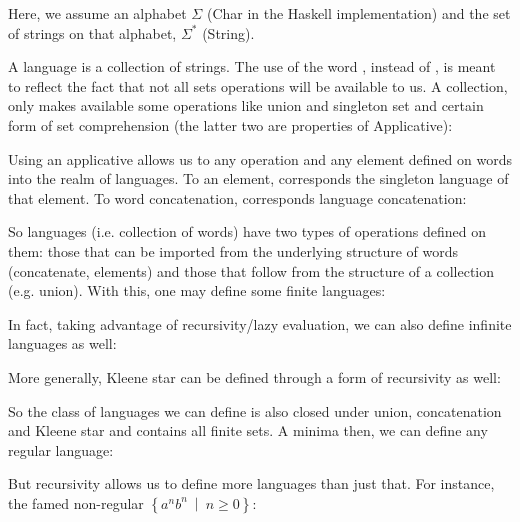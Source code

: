 Here, we assume an alphabet $\Sigma$ (\textsf{Char} in the Haskell implementation) and the set of strings on that alphabet, $\Sigma^*$ (\textsf{String}).

A language is a collection of strings. The use of the word , instead of , is meant to reflect the fact that not all sets operations will be available to us. A collection, only makes available some operations like union and singleton set and certain form of set comprehension (the latter two are properties of \textsf{Applicative}): 



Using an applicative allows us to  any operation and any element defined on words into the realm of languages. To an element, corresponds the singleton language of that element. To word concatenation, corresponds language concatenation:



So languages (i.e. collection of words) have two types of operations defined on them: those that can be imported from the underlying structure of words (concatenate, elements) and those that follow from the structure of a collection (e.g. union). With this, one may define some finite languages:



In fact, taking advantage of recursivity/lazy evaluation, we can also define infinite languages as well:



More generally, Kleene star can be defined through a form of recursivity as well:



So the class of languages we can define is also closed under union, concatenation and Kleene star and contains all finite sets. A minima then, we can define any regular language:



But recursivity allows us to define more languages than just that. For instance, the famed non-regular $\left\lbrace a^nb^n\ \middle|\ n\geq 0\right\rbrace$:



